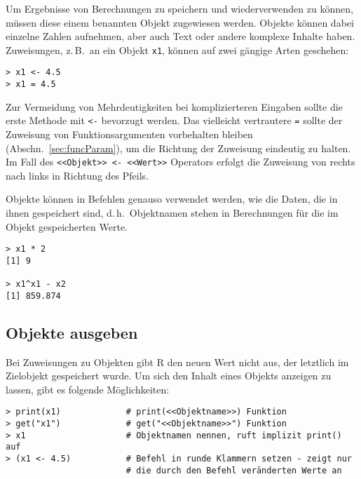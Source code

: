 Um Ergebnisse von Berechnungen zu speichern und wiederverwenden zu können, müssen diese einem benannten Objekt zugewiesen werden. Objekte können dabei einzelne Zahlen aufnehmen, aber auch Text oder andere komplexe Inhalte haben. Zuweisungen, z.\,B.\ an ein Objekt \lstinline!x1!, können auf zwei gängige Arten geschehen:
\begin{lstlisting}
> x1 <- 4.5
> x1 = 4.5
\end{lstlisting}

Zur Vermeidung von Mehrdeutigkeiten bei komplizierteren Eingaben sollte die erste Methode mit \lstinline!<-! bevorzugt werden. Das vielleicht vertrautere \lstinline!=! sollte der Zuweisung von Funktionsargumenten vorbehalten bleiben (Abschn.\ \ref{sec:funcParam}), um die Richtung der Zuweisung eindeutig zu halten. Im Fall des \lstinline!<<Objekt>> <- <<Wert>>! Operators erfolgt die Zuweisung von rechts nach links in Richtung des Pfeils.

Objekte können in Befehlen genauso verwendet werden, wie die Daten, die in ihnen gespeichert sind, d.\,h.\ Objektnamen stehen in Berechnungen für die im Objekt gespeicherten Werte.
\begin{lstlisting}
> x1 * 2
[1] 9

> x1^x1 - x2
[1] 859.874
\end{lstlisting}

\subsection{Objekte ausgeben}
\label{sec:printObject}

Bei Zuweisungen zu Objekten gibt R den neuen Wert nicht aus, der letztlich im Zielobjekt gespeichert wurde. Um sich den Inhalt eines Objekts anzeigen zu lassen, gibt es folgende Möglichkeiten:
\begin{lstlisting}
> print(x1)             # print(<<Objektname>>) Funktion
> get("x1")             # get("<<Objektname>>") Funktion
> x1                    # Objektnamen nennen, ruft implizit print() auf
> (x1 <- 4.5)           # Befehl in runde Klammern setzen - zeigt nur
                        # die durch den Befehl veränderten Werte an
\end{lstlisting}

